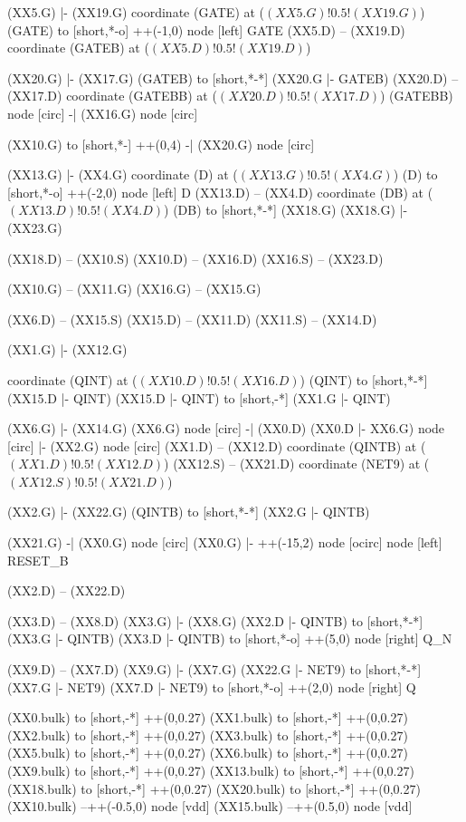 \begin{circuitikz}[american]
	
	(XX5.G) |- (XX19.G)
	coordinate (GATE) at ($(XX5.G)!0.5!(XX19.G)$)
	(GATE) to [short,*-o] ++(-1,0) node [left] {GATE}
	(XX5.D) -- (XX19.D)
	coordinate (GATEB) at ($(XX5.D)!0.5!(XX19.D)$)
	
	(XX20.G) |- (XX17.G)
	(GATEB) to [short,*-*] (XX20.G |- GATEB)
	(XX20.D) -- (XX17.D)
	coordinate (GATEBB) at ($(XX20.D)!0.5!(XX17.D)$)
	(GATEBB) node [circ] {} -| (XX16.G) node [circ] {}

	(XX10.G) to [short,*-] ++(0,4) -| (XX20.G) node [circ] {}

	(XX13.G) |- (XX4.G)
	coordinate (D) at ($(XX13.G)!0.5!(XX4.G)$)
	(D) to [short,*-o] ++(-2,0) node [left] {D}
	(XX13.D) -- (XX4.D) 
	coordinate (DB) at ($(XX13.D)!0.5!(XX4.D)$)
	(DB) to [short,*-*] (XX18.G)
	(XX18.G) |- (XX23.G)
		
	(XX18.D) -- (XX10.S) 
	(XX10.D) -- (XX16.D)
	(XX16.S) -- (XX23.D)
	
	(XX10.G) -- (XX11.G)
	(XX16.G) -- (XX15.G)
	
	(XX6.D) -- (XX15.S)
	(XX15.D) -- (XX11.D)
	(XX11.S) -- (XX14.D)
	
	(XX1.G) |- (XX12.G)	
	
	coordinate (QINT) at ($(XX10.D)!0.5!(XX16.D)$)
	(QINT) to [short,*-*] (XX15.D |- QINT)
	(XX15.D |- QINT) to [short,-*] (XX1.G |- QINT)	
	
	(XX6.G) |- (XX14.G)
	(XX6.G) node [circ] {} -| (XX0.D)
	(XX0.D |- XX6.G) node [circ] {} |- (XX2.G) node [circ] {} 
	(XX1.D) -- (XX12.D)
	coordinate (QINTB) at ($(XX1.D)!0.5!(XX12.D)$)
	(XX12.S) -- (XX21.D)
	coordinate (NET9) at ($(XX12.S)!0.5!(XX21.D)$)
	
	(XX2.G) |- (XX22.G)
	(QINTB) to [short,*-*] (XX2.G |- QINTB) 
	
	(XX21.G) -| (XX0.G) node [circ] {}
	(XX0.G) |- ++(-15,2) node [ocirc] {} node [left] {RESET\_B}
	
	(XX2.D) -- (XX22.D)
	
	(XX3.D) -- (XX8.D)
	(XX3.G) |- (XX8.G)
	(XX2.D |- QINTB) to [short,*-*] (XX3.G |- QINTB)
	(XX3.D |- QINTB) to [short,*-o] ++(5,0) node [right] {Q\_N}
	
	(XX9.D) -- (XX7.D)
	(XX9.G) |- (XX7.G)
	(XX22.G |- NET9) to [short,*-*] (XX7.G |- NET9)
	(XX7.D |- NET9) to [short,*-o] ++(2,0) node [right] {Q} 
	
	(XX0.bulk) to [short,-*] ++(0,0.27)
	(XX1.bulk) to [short,-*] ++(0,0.27)
	(XX2.bulk) to [short,-*] ++(0,0.27)
	(XX3.bulk) to [short,-*] ++(0,0.27)
	(XX5.bulk) to [short,-*] ++(0,0.27)
	(XX6.bulk) to [short,-*] ++(0,0.27)
	(XX9.bulk) to [short,-*] ++(0,0.27)
	(XX13.bulk) to [short,-*] ++(0,0.27)
	(XX18.bulk) to [short,-*] ++(0,0.27)	
	(XX20.bulk) to [short,-*] ++(0,0.27)	
	(XX10.bulk) --++(-0.5,0) node [vdd] {}
	(XX15.bulk) --++(0.5,0) node [vdd] {}
	

\end{circuitikz}
